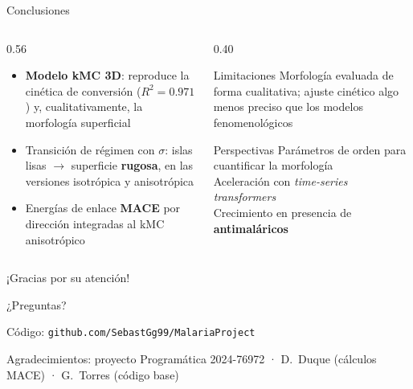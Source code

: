 \documentclass[aspectratio=169,11pt]{beamer}
\begin{document}
\begin{frame}{Conclusiones}
  \begin{columns}[T,onlytextwidth]
    \begin{column}{0.56\textwidth}
      \begin{itemize}\setlength{\itemsep}{0.7em}
        \item \textbf{Modelo kMC 3D}: reproduce la cinética de conversión ($R^2=0.971$) y, cualitativamente, la morfología superficial
        \item Transición de régimen con $\sigma$: islas lisas $\to$ superficie \textbf{rugosa}, en las versiones isotrópica y anisotrópica
        \item Energías de enlace \textbf{MACE} por dirección integradas al kMC anisotrópico
      \end{itemize}
    \end{column}
    \begin{column}{0.40\textwidth}
      \begin{block}{Limitaciones}
        \small Morfología evaluada de forma cualitativa; ajuste cinético algo menos preciso que los modelos fenomenológicos
      \end{block}
      \vspace{0.4em}
      \begin{block}{Perspectivas}
        \small
        Parámetros de orden para cuantificar la morfología\\[0.2em]
        Aceleración con \textit{time-series transformers}\\[0.2em]
        Crecimiento en presencia de \textbf{antimaláricos}
      \end{block}
    \end{column}
  \end{columns}
\end{frame}

\begin{frame}{¡Gracias por su atención!}
  \vfill
  \begin{block}{}
    \centering
    \Large ¿Preguntas?
  \end{block}
  \vfill
  \centering
  {\small Código: \texttt{github.com/SebastGg99/MalariaProject}\par}
  \vspace{0.6em}
  {\scriptsize\color{gris}Agradecimientos: proyecto Programática 2024-76972 · D.~Duque (cálculos MACE) · G.~Torres (código base)\par}
  \vfill
\end{frame}
\end{document}
